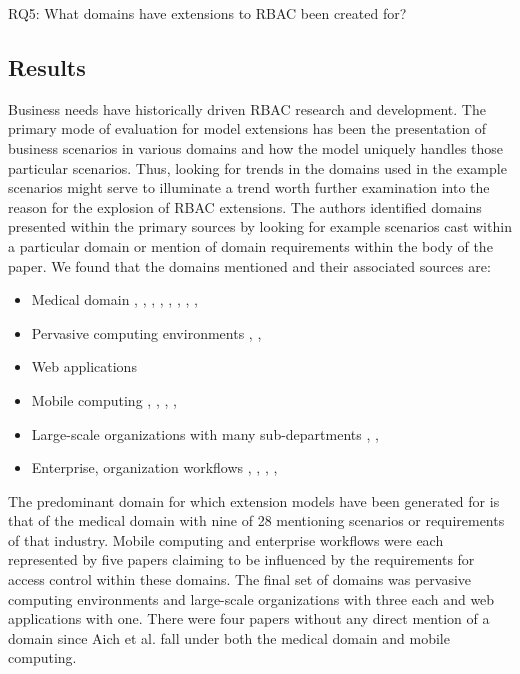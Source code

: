 RQ5: What domains have extensions to RBAC been created for?

\subsection{Results}

Business needs have historically driven RBAC research and development.  The primary mode of evaluation for
model extensions has been the presentation of business scenarios in various domains and how the model
uniquely handles those particular scenarios.  Thus, looking for trends in the domains used in the example
scenarios might serve to illuminate a trend worth further examination into the reason for the explosion of
RBAC extensions.  The authors identified domains presented within the primary sources by looking for example
scenarios cast within a particular domain or mention of domain requirements within the body of the paper.
We found that the domains mentioned and their associated sources are:

\begin{itemize}
\setlength{\itemsep}{0.25pt}
\item Medical domain \cite{alam06:constraint}, \cite{tzelepi01:flexible}, \cite{motta03:contextual}, \cite{ni2010privacy}, \cite{damiani2007geo}, \cite{hansen2003spatial}, \cite{samuel07:spatio-temporal}, \cite{aich09:role}, \cite{zhou2007team}
\item Pervasive computing environments \cite{huang06:pervasive}, \cite{chen08:spatio-temporal}, \cite{ray07:spatio}
\item Web applications \cite{masoumzadeh2008purbac}
\item Mobile computing \cite{thein2011leveraging}, \cite{zou2009crbac}, \cite{chandran05:llt}, \cite{ray07:spatio}, \cite{aich09:role}
\item Large-scale organizations with many sub-departments \cite{yamazaki04:designing}, \cite{han08:extended}, \cite{yao2008task}
\item Enterprise, organization workflows \cite{cholewka00:acontext-sensitive}, \cite{bao08:role}, \cite{zhang06:collaborative}, \cite{oh2003task}, \cite{joshi05:generalized}
\end{itemize}

The predominant domain for which extension models have been generated for is that of the medical domain with nine of 28 mentioning scenarios or requirements of that industry.
Mobile computing and enterprise workflows were each represented by five papers claiming to be influenced by the requirements for access control within these domains. The final set
of domains was pervasive computing environments and large-scale organizations with three each and web applications with one.  There were four papers without any direct mention of a domain
since Aich et al. \cite{aich09:role} fall under both the medical domain and mobile computing.

